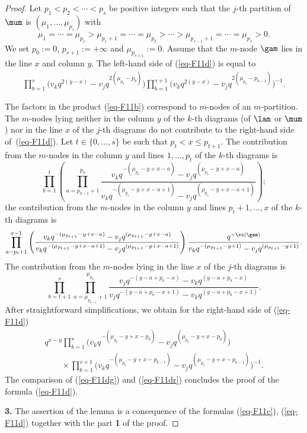 \begin{proof}
Let $p_1<p_2<\cdots<p_s$ be positive integers such that the $j$-th partition of $\mum$ is $(\mu_1,\dots,\mu_{p_s})$ with
\[
\mu_1=\cdots=\mu_{p_1}>\mu_{p_1+1}=\cdots=\mu_{p_2}>\cdots >\mu_{p_{s-1}+1}=\cdots=\mu_{p_s}>0  .
\]
We set $p_0:=0$, $p_{s+1}:=+\infty$ and $\mu_{p_{s+1}}:=0$.
Assume that the $m$-node $\gam$ lies in the line $x$ and column $y$.
The left-hand side of (\ref{eq-F11d}) is equal to
\begin{gather}\label{eq-F11dg}
\prod_{b=1}^s\big(v_kq^{2(y-x)}-v_jq^{2(\mu_{p_b}-p_b)}\big)  \prod_{b=1}^{s+1}\big(v_kq^{2(y-x)}-v_jq^{2(\mu_{p_b}-p_{b-1})}\big)^{-1} .
\end{gather}

The factors in the product (\ref{eq-F11b}) correspond to
$m$-nodes of an $m$-partition.
The $m$-nodes  lying neither in the column $y$ of the $k$-th diagrams (of $\lam$ or $\mum$) nor in the line $x$ of the $j$-th
diagrams do not contribute to the right-hand side of~(\ref{eq-F11d}).
Let $t\in\{0,\dots,s\}$ be such that $p_t<x\leq p_{t+1}$. The contribution from the $m$-nodes in the column $y$ and lines $1,\dots,p_t$ of the $k$-th diagrams is
\[
\prod_{b=1}^t\left(\prod_{a=p_{b-1}+1}^{p_b}\frac{v_kq^{-(\mu_{p_b}-y+x-a)}-v_jq^{(\mu_{p_b}-y+x-a)}}
{v_kq^{-(\mu_{p_b}-y+x-a+1)}-v_jq^{(\mu_{p_b}-y+x-a+1)}}\right);
\]
the contribution from the $m$-nodes in the column $y$ and lines $p_t+1,\dots,x$ of the $k$-th diagrams is
\[
\prod_{a=p_t+1}^{x-1}\left(\frac{v_kq^{-(\mu_{p_{t+1}}-y+x-a)}-v_jq^{(\mu_{p_{t+1}}-y+x-a)}}
{v_kq^{-(\mu_{p_{t+1}}-y+x-a+1)}-v_jq^{(\mu_{p_{t+1}}-y+x-a+1)}}\right) \frac{q^{-\cc(\gam)}}{v_kq^{-(\mu_{p_{t+1}}-y+1)}-v_jq^{(\mu_{p_{t+1}}-y+1)}} .
\]
The contribution from the $m$-nodes lying in the line $x$ of the $j$-th diagrams is
\[
\prod_{b=t+1}^s\prod_{a=\mu_{p_{b+1}}+1}^{\mu_{p_b}}\frac{v_jq^{-(y-a+p_b-x)}-v_kq^{(y-a+p_b-x)}}{v_jq^{-(y-a+p_b-x+1)}-v_kq^{(y-a+p_b-x+1)}} .
\]
After straightforward simplif\/ications, we obtain for the right-hand side of (\ref{eq-F11d})
\begin{gather}
q^{x-y}\prod_{b=1}^s\bigl(v_kq^{-(\mu_{p_b}-y+x-p_b)} -v_jq^{(\mu_{p_b}-y+x-p_b)}\bigr)\nonumber\\
\qquad {}\times \prod_{b=1}^{s+1}\bigl(v_kq^{-(\mu_{p_b}-y+x-p_{b-1})} -v_jq^{(\mu_{p_b}-y+x-p_{b-1})}\bigr)^{-1} .\label{eq-F11dr}
\end{gather}
The comparison of (\ref{eq-F11dg}) and (\ref{eq-F11dr}) concludes the proof of the formula (\ref{eq-F11d}).


 {\bf 3.} The assertion of the lemma is a consequence of the formulas (\ref{eq-F11c}),
 (\ref{eq-F11d}) together with the part {\bf 1} of the proof.
\end{proof}

